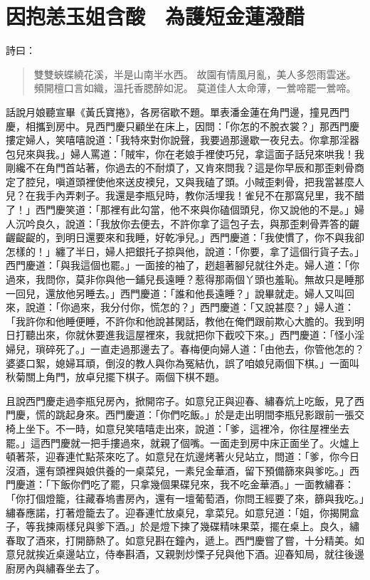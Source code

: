 
\chapter{因抱恙玉姐含酸　為護短金蓮潑醋}

詩曰：
\begin{quote}
雙雙蛺蝶繞花溪，半是山南半水西。
故園有情風月亂，美人多怨雨雲迷。
頻開檀口言如織，溫托香腮醉如泥。
莫道佳人太命薄，一鶯啼罷一鶯啼。
\end{quote}

話說月娘聽宣畢《黃氏寶捲》，各房宿歇不題。單表潘金蓮在角門邊，撞見西門慶，相攜到房中。見西門慶只顧坐在床上，因問：「你怎的不脫衣裳？」那西門慶摟定婦人，笑嘻嘻說道：「我特來對你說聲，我要過那邊歇一夜兒去。你拿那淫器包兒來與我。」婦人罵道：「賊牢，你在老娘手裡使巧兒，拿這面子話兒來哄我！我剛纔不在角門首站著，你過去的不耐煩了，又肯來問我？這是你早辰和那歪剌骨商定了腔兒，嗔道頭裡使他來送皮襖兒，又與我磕了頭。小賊歪剌骨，把我當甚麼人兒？在我手內弄剌子。我還是李瓶兒時，教你活埋我！雀兒不在那窩兒里，我不醋了！」西門慶笑道：「那裡有此勾當，他不來與你磕個頭兒，你又說他的不是。」婦人沉吟良久，說道：「我放你去便去，不許你拿了這包子去，與那歪剌骨弄答的齷齷齪齪的，到明日還要來和我睡，好乾凈兒。」西門慶道：「我使慣了，你不與我卻怎樣的！」纏了半日，婦人把銀托子掠與他，說道：「你要，拿了這個行貨子去。」西門慶道：「與我這個也罷。」一面接的袖了，趔趄著腳兒就往外走。婦人道：「你過來，我問你，莫非你與他一鋪兒長遠睡？惹得那兩個丫頭也羞恥。無故只是睡那一回兒，還放他另睡去。」西門慶道：「誰和他長遠睡？」說畢就走。婦人又叫回來，說道：「你過來，我分付你，慌怎的？」西門慶道：「又說甚麼？」婦人道：「我許你和他睡便睡，不許你和他說甚閑話，教他在俺們跟前欺心大膽的。我到明日打聽出來，你就休要進我這屋裡來，我就把你下截咬下來。」西門慶道：「怪小淫婦兒，瑣碎死了。」一直走過那邊去了。春梅便向婦人道：「由他去，你管他怎的？婆婆口絮，媳婦耳頑，倒沒的教人與你為冤結仇，誤了咱娘兒兩個下棋。」一面叫秋菊關上角門，放卓兒擺下棋子。兩個下棋不題。

且說西門慶走過李瓶兒房內，掀開帘子。如意兒正與迎春、繡春炕上吃飯，見了西門慶，慌的跳起身來。西門慶道：「你們吃飯。」於是走出明間李瓶兒影跟前一張交椅上坐下。不一時，如意兒笑嘻嘻走出來，說道：「爹，這裡冷，你往屋裡坐去罷。」這西門慶就一把手摟過來，就親了個嘴。一面走到房中床正面坐了。火爐上頓著茶，迎春連忙點茶來吃了。如意兒在炕邊烤著火兒站立，問道：「爹，你今日沒酒，還有頭裡與娘供養的一桌菜兒，一素兒金華酒，留下預備篩來與爹吃。」西門慶道：「下飯你們吃了罷，只拿幾個果碟兒來，我不吃金華酒。」一面教繡春：「你打個燈籠，往藏春塢書房內，還有一壇葡萄酒，你問王經要了來，篩與我吃。」繡春應諾，打著燈籠去了。迎春連忙放桌兒，拿菜兒。如意兒道：「姐，你揭開盒子，等我揀兩樣兒與爹下酒。」於是燈下揀了幾碟精味果菜，擺在桌上。良久，繡春取了酒來，打開篩熱了。如意兒斟在鐘內，遞上。西門慶嘗了嘗，十分精美。如意兒就挨近桌邊站立，侍奉斟酒，又親剝炒慄子兒與他下酒。迎春知局，就往後邊廚房內與繡春坐去了。

